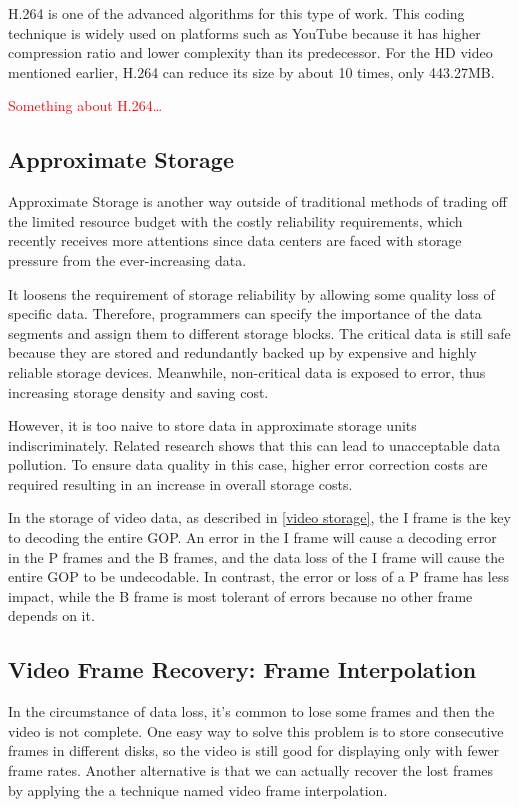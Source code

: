 \documentclass[sigconf]{acmart}
\begin{document}
H.264 is one of the advanced algorithms for this type of work. This coding technique is widely used on platforms such as YouTube because it has higher compression ratio and lower complexity than its predecessor. For the HD video mentioned earlier, H.264 can reduce its size by about 10 times, only 443.27MB.

\textcolor{red}{Something about H.264\dots}

\subsection{Approximate Storage}
Approximate Storage is another way outside of traditional methods of trading off the limited resource budget with the costly reliability requirements, which recently receives more attentions since data centers are faced with storage pressure from the ever-increasing data.

It loosens the requirement of storage reliability by allowing some quality loss of specific data. Therefore, programmers can specify the importance of the data segments and assign them to different storage blocks. The critical data is still safe because they are stored and redundantly backed up by expensive and highly reliable storage devices. Meanwhile, non-critical data is exposed to error, thus increasing storage density and saving cost.

However, it is too naive to store data in approximate storage units indiscriminately. Related research \cite{guo2016high} shows that this can lead to unacceptable data pollution. To ensure data quality in this case, higher error correction costs are required resulting in an increase in overall storage costs.

In the storage of video data, as described in \ref{video storage}, the I frame is the key to decoding the entire GOP. An error in the I frame will cause a decoding error in the P frames and the B frames, and the data loss of the I frame will cause the entire GOP to be undecodable. In contrast, the error or loss of a P frame has less impact, while the B frame is most tolerant of errors because no other frame depends on it.

\subsection{Video Frame Recovery: Frame Interpolation}
In the circumstance of data loss, it's common to lose some frames and then the video is not complete. One easy way to solve this problem is to store consecutive frames in different disks, so the video is still good for displaying only with fewer frame rates. Another alternative is that we can actually recover the lost frames by applying the a technique named video frame interpolation.
\end{document}
